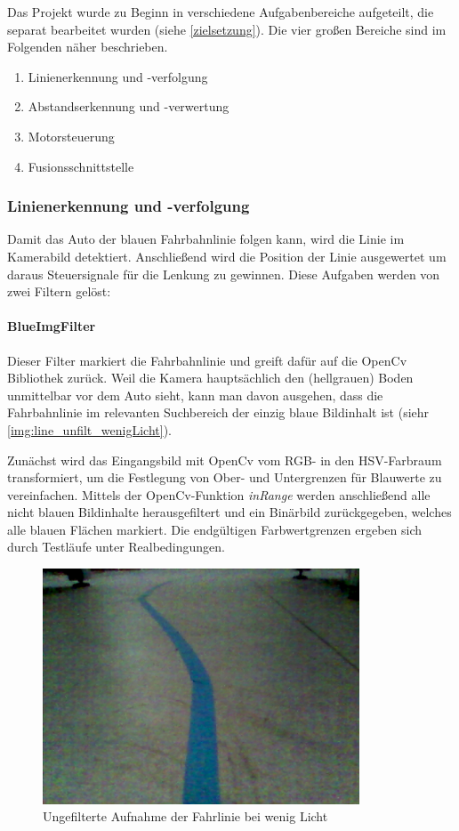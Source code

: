 \documentclass[12pt, a4paper]{scrartcl}
\begin{document}
Das Projekt wurde zu Beginn in verschiedene Aufgabenbereiche aufgeteilt, die separat bearbeitet wurden (siehe \autoref{zielsetzung}). Die vier großen Bereiche sind im Folgenden näher beschrieben.

\begin{enumerate}
	\item Linienerkennung und -verfolgung
	\item Abstandserkennung und -verwertung
	\item Motorsteuerung
	\item Fusionsschnittstelle
\end{enumerate}


\subsubsection{Linienerkennung und -verfolgung}
Damit das Auto der blauen Fahrbahnlinie folgen kann, wird die Linie im Kamerabild detektiert. Anschließend wird die Position der Linie ausgewertet um daraus Steuersignale für die Lenkung zu gewinnen. Diese Aufgaben werden von zwei Filtern gelöst:

\paragraph{BlueImgFilter}
Dieser Filter markiert die Fahrbahnlinie und greift dafür auf die OpenCv Bibliothek zurück. Weil die Kamera hauptsächlich den (hellgrauen) Boden unmittelbar vor dem Auto sieht, kann man davon ausgehen, dass die Fahrbahnlinie im relevanten Suchbereich der einzig blaue Bildinhalt ist (siehr \autoref{img:line_unfilt_wenigLicht}).

Zunächst wird das Eingangsbild mit OpenCv vom RGB- in den HSV-Farbraum transformiert, um die Festlegung von Ober- und Untergrenzen für Blauwerte zu vereinfachen. Mittels der OpenCv-Funktion \emph{inRange} werden anschließend alle nicht blauen Bildinhalte herausgefiltert und ein Binärbild zurückgegeben, welches alle blauen Flächen markiert. Die endgültigen Farbwertgrenzen ergeben sich durch Testläufe unter Realbedingungen.    

\begin{figure}[h]
	\centering
	\includegraphics[width=\textwidth, height=7cm, keepaspectratio]{Bilder/line_unfilt_wenigLicht.png}
	\caption{Ungefilterte Aufnahme der Fahrlinie bei wenig Licht}
	\label{img:line_unfilt_wenigLicht}
\end{figure}
\end{document}
